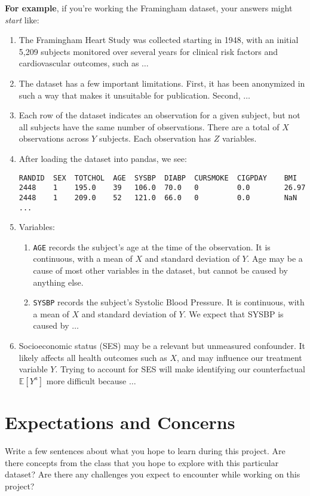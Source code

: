 \documentclass[12pt]{article}
\begin{document}
{\bf For example}, if you're working the Framingham dataset, your answers might \emph{start} like:
\begin{enumerate}[itemsep=0em,label={(\alph*)}]
\item The Framingham Heart Study was collected starting in 1948, with an initial 5,209 subjects monitored over several years for clinical risk factors and cardiovascular outcomes, such as $\ldots$
\item The dataset has a few important limitations. First, it has been anonymized in such a way that makes it unsuitable for publication. Second, $\ldots$
\item Each row of the dataset indicates an observation for a given subject, but not all subjects have the same number of observations. There are a total of $X$ observations across $Y$ subjects. Each observation has $Z$ variables. 
\item After loading the dataset into pandas, we see:
\begin{verbatim}
RANDID  SEX  TOTCHOL  AGE  SYSBP  DIABP  CURSMOKE  CIGPDAY    BMI 
2448    1    195.0    39   106.0  70.0   0         0.0        26.97 
2448    1    209.0    52   121.0  66.0   0         0.0        NaN
...
\end{verbatim}
\item Variables:
  \begin{enumerate}[itemsep=0em,label={\roman*.}]
     \item {\tt AGE} records the subject's age at the time of the observation. It is continuous, with a mean of $X$ and standard deviation of $Y$. Age may be a cause of most other variables in the dataset, but cannot be caused by anything else.
     \item {\tt SYSBP} records the subject's Systolic Blood Pressure. It is continuous, with a mean of $X$ and standard deviation of $Y$. We expect that SYSBP is caused by $\ldots$
  \end{enumerate}
\item Socioeconomic status (SES) may be a relevant but unmeasured confounder. It likely affects all health outcomes such as $X$, and may influence our treatment variable $Y$. Trying to account for SES will make identifying our counterfactual $\mathbb{E}[Y^a]$ more difficult because $\ldots$
\end{enumerate}

\section{Expectations and Concerns}

Write a few sentences about what you hope to learn during this project. Are there concepts from the class that you hope to explore with this particular dataset? Are there any challenges you expect to encounter while working on this project?
\end{document}
